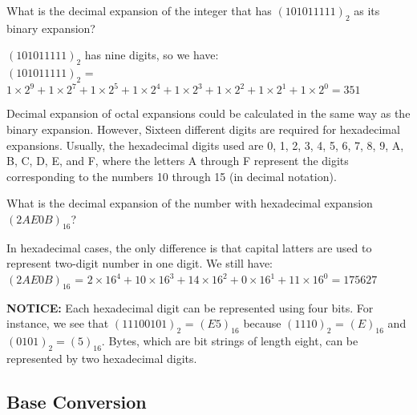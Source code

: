 \begin{example}
	What is the decimal expansion of the integer that has $(101011111)_2$ as its binary expansion?

		$(101011111)_2$ has nine digits, so we have:\\
		$(101011111)_2$ = $1\times 2^9 + 1\times 2^7+1\times 2^5+1\times 2^4+1\times 2^3+1\times 2^2+1\times 2^1+1\times 2^0 = 351$

\end{example}
Decimal expansion of octal expansions could be calculated in the same way as the binary expansion. However, 
Sixteen different digits are required for hexadecimal expansions. Usually, the hexadecimal digits used are 
0, 1, 2, 3, 4, 5, 6, 7, 8, 9, A, B, C, D, E, and F, where the letters A through F represent the digits 
corresponding to the numbers 10 through 15 (in decimal notation). 
\begin{example}
	What is the decimal expansion of the number with hexadecimal expansion $(2AE0B)_{16}$?
\end{example}
In hexadecimal cases, the only difference is that capital latters are used to represent two-digit number in
		one digit. We still have:\\
		$(2AE0B)_{16}$ = $2\times 16^4 + 10\times 16^3 + 14\times 16^2 + 0 \times 16^1 + 11 \times 16^0=175627$

        \textbf{NOTICE: } Each hexadecimal digit can be represented using four bits. For instance, 
we see that $(1110 0101)_2$ = $(E5)_{16}$ because $(1110)_2$ = $(E)_{16}$ and $(0101)_2 = (5)_{16}$. Bytes, which are bit strings 
of length eight, can be represented by two hexadecimal digits.

    \subsection{Base Conversion}
